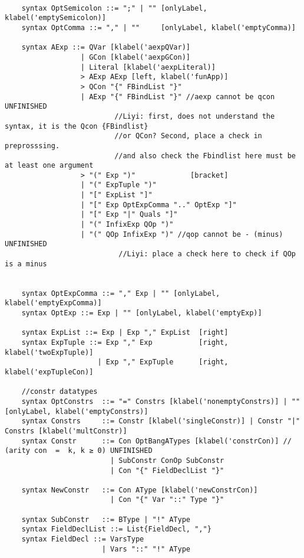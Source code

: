 \begin{lstlisting}

    syntax OptSemicolon ::= ";" | "" [onlyLabel, klabel('emptySemicolon)]
    syntax OptComma ::= "," | ""     [onlyLabel, klabel('emptyComma)]

    syntax AExp ::= QVar [klabel('aexpQVar)]
                  | GCon [klabel('aexpGCon)]
                  | Literal [klabel('aexpLiteral)]
                  > AExp AExp [left, klabel('funApp)]
                  > QCon "{" FBindList "}"
                  | AExp "{" FBindList "}" //aexp cannot be qcon UNFINISHED
                          //Liyi: first, does not understand the syntax, it is the Qcon {FBindlist}
                          //or QCon? Second, place a check in preprosssing.
                          //and also check the Fbindlist here must be at least one argument
                  > "(" Exp ")"             [bracket]
                  | "(" ExpTuple ")"
                  | "[" ExpList "]"
                  | "[" Exp OptExpComma ".." OptExp "]"
                  | "[" Exp "|" Quals "]"
                  | "(" InfixExp QOp ")"
                  | "(" QOp InfixExp ")" //qop cannot be - (minus) UNFINISHED
                           //Liyi: place a check here to check if QOp is a minus
                           

    syntax OptExpComma ::= "," Exp | "" [onlyLabel, klabel('emptyExpComma)]
    syntax OptExp ::= Exp | "" [onlyLabel, klabel('emptyExp)]

    syntax ExpList ::= Exp | Exp "," ExpList  [right]
    syntax ExpTuple ::= Exp "," Exp           [right, klabel('twoExpTuple)]
                      | Exp "," ExpTuple      [right, klabel('expTupleCon)]

    //constr datatypes
    syntax OptConstrs  ::= "=" Constrs [klabel('nonemptyConstrs)] | "" [onlyLabel, klabel('emptyConstrs)]
    syntax Constrs     ::= Constr [klabel('singleConstr)] | Constr "|" Constrs [klabel('multConstr)]
    syntax Constr      ::= Con OptBangATypes [klabel('constrCon)] // (arity con  =  k, k ≥ 0) UNFINISHED
                         | SubConstr ConOp SubConstr
                         | Con "{" FieldDeclList "}"

    syntax NewConstr   ::= Con AType [klabel('newConstrCon)]
                         | Con "{" Var "::" Type "}"

    syntax SubConstr   ::= BType | "!" AType
    syntax FieldDeclList ::= List{FieldDecl, ","}
    syntax FieldDecl ::= VarsType
                       | Vars "::" "!" AType



\end{lstlisting}

